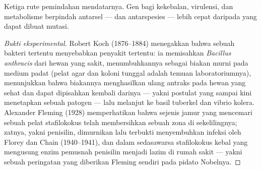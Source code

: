 \begin{omfigure}

{\small Ketiga rute pemindahan mendatarnya. Gen bagi kekebalan,
virulensi, dan metabolisme berpindah antarsel --- dan antarspesies ---
lebih cepat daripada yang dapat dibuat mutasi.}
\end{omfigure}

\begin{proof}[Bukti eksperimental]
Robert Koch (1876--1884) menegakkan bahwa sebuah bakteri tertentu menyebabkan
penyakit tertentu: ia memisahkan \emph{Bacillus anthracis} dari hewan yang
sakit, menumbuhkannya sebagai biakan murni pada medium padat (pelat agar dan
koloni tunggal adalah temuan laboratoriumnya), menunjukkan bahwa biakannya
menghasilkan ulang antraks pada hewan yang sehat dan dapat dipisahkan kembali
darinya --- yakni postulat yang sampai kini menetapkan sebuah patogen --- lalu
melanjut ke basil tuberkel dan vibrio kolera. Alexander Fleming
(1928) memperhatikan bahwa sejenis jamur yang mencemari sebuah pelat
stafilokokus telah membersihkan sebuah zona di sekelilingnya; zatnya, yakni
penisilin, dimurnikan lalu terbukti menyembuhkan infeksi oleh Florey dan Chain
(1940--1941), dan dalam sedasawarsa stafilokokus kebal yang mengusung
enzim pemusnah penisilin menjadi lazim di rumah sakit --- yakni sebuah
peringatan yang diberikan Fleming sendiri pada pidato Nobelnya.
\end{proof}

